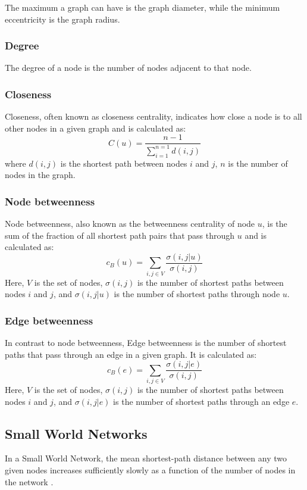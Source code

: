 The maximum a graph can have is the graph diameter, while the minimum eccentricity is the graph radius.

\subsubsection{Degree}
The degree of a node is the number of nodes adjacent to that node.

\subsubsection{Closeness}
Closeness, often known as closeness centrality, indicates how close a node is to all other nodes in a given graph and is calculated as:
\begin{equation}
    C(u) = \frac{n-1}{\sum_{i=1}^{n=1}d(i, j)}
\end{equation}
where $d(i,j)$ is the shortest path between nodes $i$ and $j$, $n$ is the number of nodes in the graph.

\subsubsection{Node betweenness}
Node betweenness, also known as the betweenness centrality of node $u$, is the sum of the fraction of all shortest path pairs that pass through $u$ and is calculated as:
\begin{equation}
    c_B(u) = \sum_{i,j \in V}\frac{\sigma(i,j|u)}{\sigma(i,j)}
\end{equation}
Here, $V$ is the set of nodes, $\sigma(i,j)$ is the number of shortest paths between nodes $i$ and $j$, and $\sigma(i,j|u)$ is the number of shortest paths through node $u$.

\subsubsection{Edge betweenness}
In contrast to node betweenness, Edge betweenness is the number of shortest paths that pass through an edge in a given graph. It is calculated as:
\begin{equation}
    c_B(e) = \sum_{i,j \in V}\frac{\sigma(i,j|e)}{\sigma(i,j)}
\end{equation}
Here, $V$ is the set of nodes, $\sigma(i,j)$ is the number of shortest paths between nodes $i$ and $j$, and $\sigma(i,j|e)$ is the number of shortest paths through an edge $e$.

\subsection{Small World Networks}
In a Small World Network, the mean shortest-path distance between any two given nodes increases sufficiently slowly as a function of the number of nodes in the network \cite{porter}.

